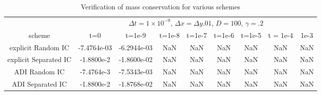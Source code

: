 \documentclass[]{article}
\theoremstyle{definition}
\numberwithin{equation}{section}
\numberwithin{equation}{section}
\begin{document}
\begin{adjustwidth}{-2cm}{}
\begin{center}
\begin{table}
\begin{tabular} {c|c|c|c|c|c|c|c|c|}
		\hline
		&  \multicolumn{8}{c|}{$\Delta t=1\times10^{-9}$, $\Delta x = \Delta y .01$, $D = 100$, $\gamma = .2$} \\ \cline{2-9} 
		scheme & t=0 & t=1e-9 & t=1e-8 & t=1e-7 & t=1e-6 & t=1e-5 & t = 1e-4 & 1e-3\\ 
			\hline
		\multicolumn{1}{|c|}{explicit Random IC} & -7.4764e-03 &  -6.2944e-03 & NaN &  NaN & NaN & NaN &NaN  & NaN \\
		\hline
		\multicolumn{1}{|c|}{explicit Separated IC} & -1.8800e-2 &  -1.8600e-02 &  NaN & NaN &  NaN & NaN & NaN &NaN  \\
		\hline
		\multicolumn{1}{|c|}{ADI Random IC}  & -7.4764e-3 &  -7.5343e-03 &  NaN & NaN &  NaN & NaN & NaN &NaN  \\
		\hline
		\multicolumn{1}{|c|}{ADI Separated IC}  & -1.8800e-2 &  -1.8768e-02&  NaN & NaN &  NaN & NaN & NaN &NaN  \\
		\hline
	\end{tabular}
\caption{Verification of mass conservation for various schemes}
\end{table}
\end{center}
\end{adjustwidth}
\end{document}
